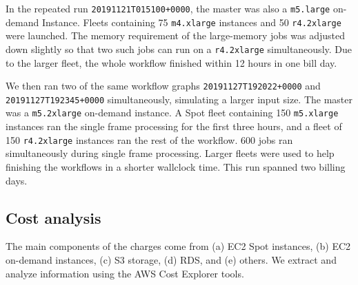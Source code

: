 In the repeated run \texttt{20191121T015100+0000}, the master was also a \texttt{m5.large} on-demand Instance.
Fleets containing 75 \texttt{m4.xlarge} instances and 50 \texttt{r4.2xlarge} were launched.
The memory requirement of the large-memory jobs was adjusted down slightly so that two such jobs can run on a \texttt{r4.2xlarge} simultaneously.
Due to the larger fleet, the whole workflow finished within 12 hours in one bill day.

We then ran two of the same workflow graphs \texttt{20191127T192022+0000} and \texttt{20191127T192345+0000} simultaneously, simulating a larger input size.
The master was a \texttt{m5.2xlarge} on-demand instance.
A Spot fleet containing 150 \texttt{m5.xlarge} instances ran the single frame processing for the first three hours, and a fleet of 150 \texttt{r4.2xlarge} instances ran the rest of the workflow.
600 jobs ran simultaneously during single frame processing.
Larger fleets were used to help finishing the workflows in a shorter wallclock time.
This run spanned two billing days.

\subsection{Cost analysis}

The main components of the charges come from (a) EC2 Spot instances, (b) EC2 on-demand instances, (c) S3 storage, (d) RDS, and (e) others.
We extract and analyze information using the AWS Cost Explorer tools.

